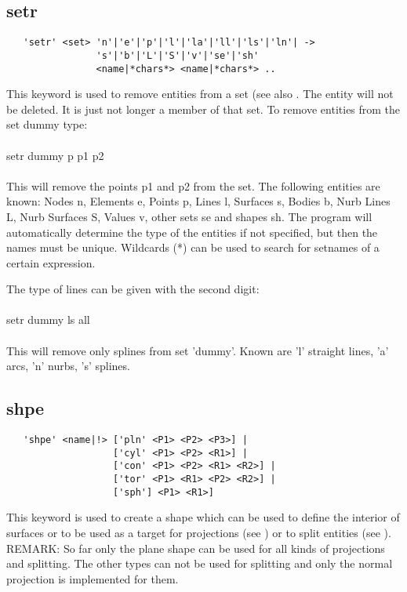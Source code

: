\documentclass{article}
\begin{document}
\subsection{\label{setr}setr}
\begin{verbatim}
   'setr' <set> 'n'|'e'|'p'|'l'|'la'|'ll'|'ls'|'ln'| ->
                's'|'b'|'L'|'S'|'v'|'se'|'sh'
                <name|*chars*> <name|*chars*> .. 
\end{verbatim}
This keyword is used to remove entities from a set (see also . The entity will not be deleted. It is just not longer a member of that set. To remove entities from the set dummy type:\\\\setr dummy p p1 p2\\\\This will remove the points p1 and p2 from the set. The following entities are known: Nodes n, Elements e, Points p, Lines l, Surfaces s, Bodies b, Nurb Lines L, Nurb Surfaces S, Values v, other sets se and shapes sh. The program will automatically determine the type of the entities if not specified, but then the names must be unique. Wildcards (*) can be used to search for setnames of a certain expression.

The type of lines can be given with the second digit:\\\\setr dummy ls
all\\\\This will remove only splines from set 'dummy'. Known are 'l' straight
lines, 'a' arcs, 'n' nurbs, 's' splines.

\subsection{\label{shpe}shpe}
\begin{verbatim}
   'shpe' <name|!> ['pln' <P1> <P2> <P3>] |
                   ['cyl' <P1> <P2> <R1>] |
                   ['con' <P1> <P2> <R1> <R2>] |
                   ['tor' <P1> <R1> <P2> <R2>] |
                   ['sph'] <P1> <R1>]
\end{verbatim}
This keyword is used to create a shape which can be used to define the interior of surfaces or to be used as a target for projections (see ) or to split entities (see ). REMARK: So far only the plane shape can be used for all kinds of projections and splitting. The other types can not be used for splitting and only the normal projection is implemented for them.
\end{document}
